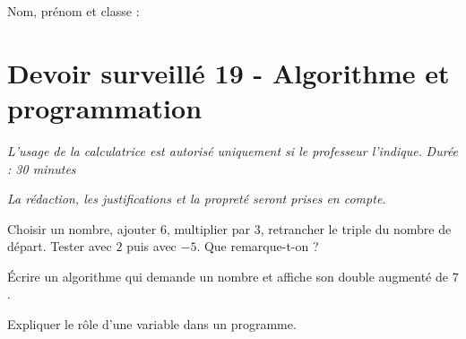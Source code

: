 \documentclass[a4paper,10pt]{report}
\begin{document}
\pagestyle{empty}
\noindent Nom, prénom et classe : \dotfill

\section*{Devoir surveillé 19 - Algorithme et programmation}

\noindent \textit{L'usage de la calculatrice est autorisé uniquement si le professeur l'indique.} \hfill \textit{Durée : 30 minutes}

\medskip
\noindent \textit{La rédaction, les justifications et la propreté seront prises en compte.}


\begin{ex}
Choisir un nombre, ajouter $6$, multiplier par $3$, retrancher le triple du nombre de départ. Tester avec $2$ puis avec $-5$. Que remarque-t-on ?
\medskip\noindent\grandscarreaux{\linewidth}{4cm}
\end{ex}
\begin{ex}[Algorithme]
Écrire un algorithme qui demande un nombre et affiche son double augmenté de $7$.
\medskip\noindent\grandscarreaux{\linewidth}{4cm}
\end{ex}
\begin{ex}[Variable]
Expliquer le rôle d'une variable dans un programme.
\medskip\noindent\grandscarreaux{\linewidth}{3cm}
\end{ex}
\end{document}
